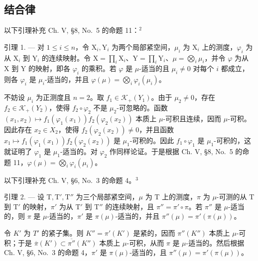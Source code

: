 \subsection{结合律}

以下引理补充 Ch. V, §8, No.~5 的命题 11：\(^{2}\)

引理 1. --- 对 \(1 \leqslant i \leqslant n\)，令 \(\mathrm{X}_i, \mathrm{Y}_i\) 为两个局部紧空间，\(\mu_i\) 为 \(\mathrm{X}_i\) 上的测度，\(\varphi_i\) 为从 \(\mathrm{X}_i\) 到 \(\mathrm{Y}_i\) 的连续映射。令 \(\mathrm{X} = \prod_i \mathrm{X}_i\)、\(\mathrm{Y} = \prod_i \mathrm{Y}_i\)、\(\mu = \bigotimes_i \mu_i\)，并令 \(\varphi\) 为从 \(\mathrm{X}\) 到 \(\mathrm{Y}\) 的映射，即各 \(\varphi_i\) 的乘积。若 \(\varphi\) 是 \(\mu\)-适当的且 \(\mu_i \neq 0\) 对每个 \(i\) 都成立，则各 \(\varphi_i\) 是 \(\mu_i\)-适当的，并且 \(\varphi(\mu) = \bigotimes_i \varphi_i(\mu_i)\)。

不妨设 \(\mu_{i}\) 为正测度且 \(n = 2\)。取 \(f_{1} \in \mathcal{K}_{+}(Y_{1})\)。由于 \(\mu_{2} \neq 0\)，存在 \(f_{2} \in \mathcal{K}_{+}(Y_{2})\)，使得 \(f_{2} \circ \varphi_{2}\) 不是 \(\mu_{2}\)-可忽略的。函数 \((x_{1}, x_{2}) \mapsto f_{1}(\varphi_{1}(x_{1})) f_{2}(\varphi_{2}(x_{2}))\) 本质上 \(\mu\)-可积且连续，因而 \(\mu\)-可积。因此存在 \(x_{2} \in X_{2}\)，使得 \(f_{2}(\varphi_{2}(x_{2})) \neq 0\)，并且函数 \(x_{1} \mapsto f_{1}(\varphi_{1}(x_{1})) f_{2}(\varphi_{2}(x_{2}))\) 是 \(\mu_{1}\)-可积的。因此 \(f_{1} \circ \varphi_{1}\) 是 \(\mu_{1}\)-可积的，这就证明了 \(\varphi_{1}\) 是 \(\mu_{1}\)-适当的。对 \(\varphi_{2}\) 作同样论证。于是根据 Ch. V, §8, No.~5 的命题 11，\(\varphi(\mu) = \bigotimes_{i} \varphi_{i}(\mu_{i})\)。

以下引理补充 Ch. V, §6, No.~3 的命题 4。\(^{3}\)

引理 2. --- 设 \(\mathrm{T}, \mathrm{T}', \mathrm{T}''\) 为三个局部紧空间，\(\mu\) 为 \(\mathrm{T}\) 上的测度，\(\pi\) 为 \(\mu\)-可测的从 \(\mathrm{T}\) 到 \(\mathrm{T}'\) 的映射，\(\pi'\) 为从 \(\mathrm{T}'\) 到 \(\mathrm{T}''\) 的连续映射，且 \(\pi'' = \pi' \circ \pi\)。若 \(\pi''\) 是 \(\mu\)-适当的，则 \(\pi\) 是 \(\mu\)-适当的，\(\pi'\) 是 \(\pi(\mu)\)-适当的，并且 \(\pi''(\mu) = \pi' (\pi(\mu))\)。

令 \(K'\) 为 \(T'\) 的紧子集。则 \(K'' = \pi'(K')\) 是紧的，因而 \(\pi''(K'')\) 本质上 \(\mu\)-可积；于是 \(\overline{\pi}(K') \subset \overline{\pi''}(K'')\) 本质上 \(\mu\)-可积，从而 \(\pi\) 是 \(\mu\)-适当的。然后根据 Ch. V, §6, No.~3 的命题 4，\(\pi'\) 是 \(\pi(\mu)\)-适当的，且 \(\pi''(\mu) = \pi'(\pi(\mu))\)。

